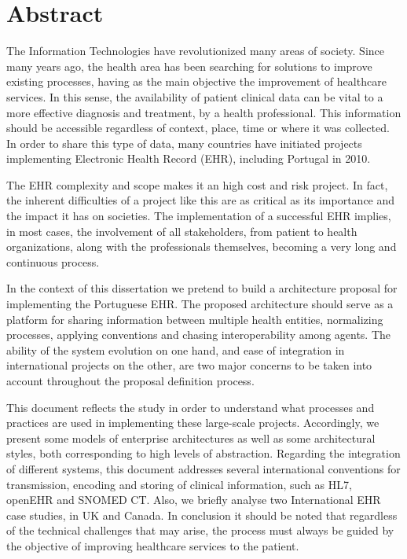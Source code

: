 \chapter*{Abstract}

The Information Technologies have revolutionized many areas of society. Since many years ago, the health area has been searching for solutions to improve existing processes, having as the main objective the improvement of healthcare services. In this sense, the availability of patient clinical data can be vital to a more effective diagnosis and treatment, by a health professional. This information should be accessible regardless of context, place, time or where it was collected. In order to share this type of data, many countries have initiated projects implementing Electronic Health Record (EHR), including Portugal in 2010.

The EHR complexity and scope makes it an high cost and risk project. In fact, the inherent difficulties of a project like this are as critical as its importance and the impact it has on societies. The implementation of a successful EHR implies, in most cases, the involvement of all stakeholders, from patient to health organizations, along with the professionals themselves, becoming a very long and continuous process.

In the context of this dissertation we pretend to build a architecture proposal for implementing the Portuguese EHR. The proposed architecture should serve as a platform for sharing information between multiple health entities, normalizing processes, applying conventions and chasing interoperability among agents. The ability of the system evolution on one hand, and ease of integration in international projects on the other, are two major concerns to be taken into account throughout the proposal definition process.

This document reflects the study in order to understand what processes and practices are used in implementing these large-scale projects. Accordingly, we present some models of enterprise architectures as well as some architectural styles, both corresponding to high levels of abstraction. Regarding the integration of different systems, this document addresses several international conventions for transmission, encoding and storing of clinical information, such as HL7, openEHR and SNOMED CT. Also, we briefly analyse two International EHR case studies, in UK and Canada. In conclusion it should be noted that regardless of the technical challenges that may arise, the process must always be guided by the objective of improving healthcare services to the patient.

